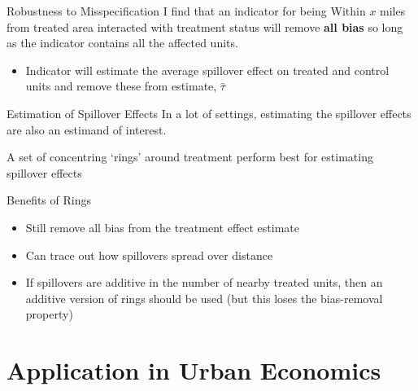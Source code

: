 \documentclass[aspectratio=169]{beamer}
\begin{document}
\begin{frame}{Robustness to Misspecification}
    I find that an indicator for being Within $x$ miles from treated area interacted with treatment status will remove \textbf{all bias} so long as the indicator contains all the affected units.

    \begin{itemize}
        \item Indicator will estimate the average spillover effect on treated and control units and remove these from estimate, $\hat{\tau}$
    \end{itemize}
\end{frame}

\begin{frame}{Estimation of Spillover Effects}
    In a lot of settings, estimating the spillover effects are also an estimand of interest.

    A set of concentring `rings' around treatment perform best for estimating spillover effects
\end{frame}


\begin{frame}{Benefits of Rings}

    \begin{itemize}
        \item Still remove all bias from the treatment effect estimate
        
        \item Can trace out how spillovers spread over distance
        
        \item If spillovers are additive in the number of nearby treated units, then an additive version of rings should be used (but this loses the bias-removal property)
    \end{itemize} 
    

\end{frame}


\section{Application in Urban Economics}
\end{document}
